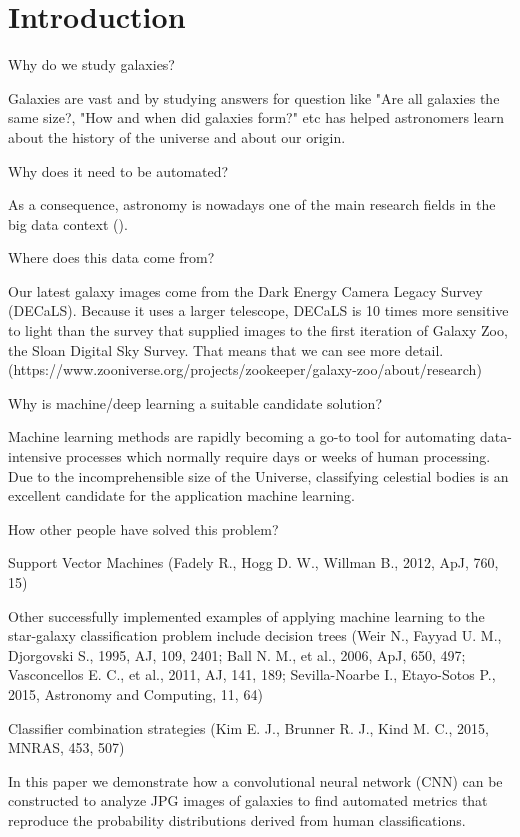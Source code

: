 \section{Introduction}

Why do we study galaxies?

Galaxies are vast and by studying answers for question like "Are all galaxies the same size?, "How and when did galaxies form?" etc has helped astronomers learn about the history of the universe and about our origin.

Why does it need to be automated?

As a consequence, astronomy is nowadays one of the main research fields in the big data context (\citeauthor{microsoft-galaxies}).

Where does this data come from?

Our latest galaxy images come from the Dark Energy Camera Legacy Survey (DECaLS). Because it uses a larger telescope, DECaLS is 10 times more sensitive to light than the survey that supplied images to the first iteration of Galaxy Zoo, the Sloan Digital Sky Survey. That means that we can see more detail. (https://www.zooniverse.org/projects/zookeeper/galaxy-zoo/about/research)

Why is machine/deep learning a suitable candidate solution?

Machine learning methods are rapidly becoming a go-to tool for automating data-intensive processes which normally require days or weeks of human processing. Due to the incomprehensible size of the Universe, classifying celestial bodies is an excellent candidate for the application machine learning.


How other people have solved this problem?

Support Vector Machines (Fadely R., Hogg D. W., Willman B., 2012, ApJ, 760, 15)

Other successfully implemented examples of applying machine learning to the star-galaxy classification problem include decision trees (Weir N., Fayyad U. M., Djorgovski S., 1995, AJ, 109, 2401; Ball N. M., et al., 2006, ApJ, 650, 497; Vasconcellos E. C., et al., 2011, AJ, 141, 189; Sevilla-Noarbe I., Etayo-Sotos P., 2015, Astronomy and Computing, 11, 64)

Classifier combination strategies (Kim E. J., Brunner R. J., Kind M. C., 2015, MNRAS, 453, 507)

In this paper we demonstrate how a convolutional neural network (CNN) can be constructed to analyze JPG images of galaxies to find automated metrics that reproduce the probability distributions derived from human classifications.
